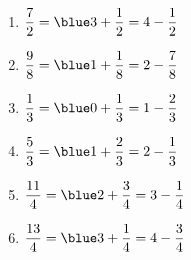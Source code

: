    \ \\ [-5mm]
   \begin{enumerate}
      \item $\dfrac72 =\blue 3+\dfrac12 =4-\dfrac12$ \medskip
      \item $\dfrac98 =\blue 1+\dfrac18 =2-\dfrac78$ \medskip
      \item $\dfrac13 =\blue 0+\dfrac13 =1-\dfrac23$ \medskip
      \item $\dfrac53 =\blue 1+\dfrac23 =2-\dfrac13$ \medskip
      \item $\dfrac{11}{4} =\blue 2+\dfrac34 =3-\dfrac14$ \medskip
      \item $\dfrac{13}{4} =\blue 3+\dfrac14 =4-\dfrac34$
   \end{enumerate}
